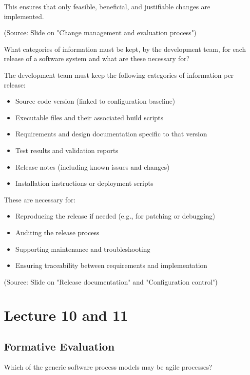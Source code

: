 \documentclass[12pt]{article}
\begin{document}
This ensures that only feasible, beneficial, and justifiable changes are implemented.

(Source: Slide on "Change management and evaluation process")

\begin{questionbox}
What categories of information must be kept, by the development team, for each release of a software system and what are these necessary for?
\end{questionbox}

The development team must keep the following categories of information per release:
\begin{itemize}
    \item Source code version (linked to configuration baseline)
    \item Executable files and their associated build scripts
    \item Requirements and design documentation specific to that version
    \item Test results and validation reports
    \item Release notes (including known issues and changes)
    \item Installation instructions or deployment scripts
\end{itemize}

These are necessary for:
\begin{itemize}
    \item Reproducing the release if needed (e.g., for patching or debugging)
    \item Auditing the release process
    \item Supporting maintenance and troubleshooting
    \item Ensuring traceability between requirements and implementation
\end{itemize}

(Source: Slide on "Release documentation" and "Configuration control")

\newpage
\section{Lecture 10 and 11}

\subsection{Formative Evaluation}

\begin{questionbox}
Which of the generic software process models may be agile processes?
\end{questionbox}
\end{document}
